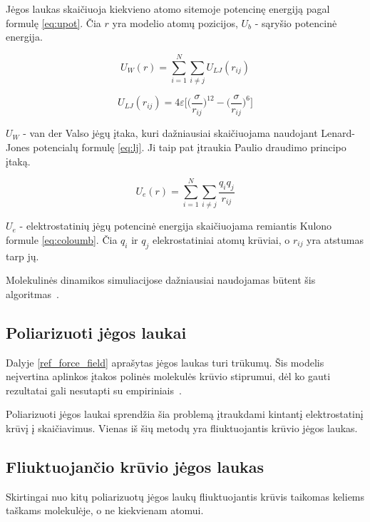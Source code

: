 \documentclass[runningheads]{llncs}
\begin{document}
Jėgos laukas skaičiuoja kiekvieno atomo sitemoje potencinę energiją pagal formulę \ref{eq:upot}.
Čia \(r\) yra modelio atomų pozicijos, \(U_b\) - sąryšio potencinė energija.

\begin{equation}
    U_W(r) = \sum\limits_{i=1}^N \sum\limits_{i\neq j} {U_{LJ}(r_{ij})}
\end{equation}

\begin{equation} \label{eq:lj}
    U_{LJ}(r_{ij}) = 4\varepsilon\Bigg[\bigg(\dfrac \sigma {r_{ij}}\bigg)^{12} - \bigg(\dfrac \sigma {r_{ij}}\bigg)^6\Bigg]
\end{equation}

\(U_W\) - van der Valso jėgų įtaka, kuri dažniausiai skaičiuojama naudojant Lenard-Jones potencialų formulę \ref{eq:lj}.
Ji taip pat įtraukia Paulio draudimo principo įtaką.

\begin{equation} \label{eq:coloumb}
    U_{e}(r) = \sum\limits_{i=1}^N \sum\limits_{i\neq j} {\dfrac{q_i q_j}{r_{ij}}}
\end{equation}

\(U_e\) - elektrostatinių jėgų potencinė energija skaičiuojama remiantis Kulono formule \ref{eq:coloumb}.
Čia \(q_i\) ir \(q_j\) elekrostatiniai atomų krūviai, o \(r_{ij}\) yra atstumas tarp jų.

Molekulinės dinamikos simuliacijose dažniausiai naudojamas būtent šis algoritmas~\cite{polar}.


\subsection{Poliarizuoti jėgos laukai}

Dalyje \ref{ref_force_field} aprašytas jėgos laukas turi trūkumų.
Šis modelis neįvertina aplinkos įtakos polinės molekulės krūvio stiprumui, dėl ko gauti rezultatai gali nesutapti su empiriniais~\cite{polar}.

Poliarizuoti jėgos laukai sprendžia šia problemą įtraukdami kintantį elektrostatinį krūvį į skaičiavimus.
Vienas iš šių metodų yra fliuktuojantis krūvio jėgos laukas.


\subsection{Fliuktuojančio krūvio jėgos laukas}

Skirtingai nuo kitų poliarizuotų jėgos laukų fliuktuojantis krūvis taikomas keliems taškams molekulėje, o ne kiekvienam atomui.
\end{document}
